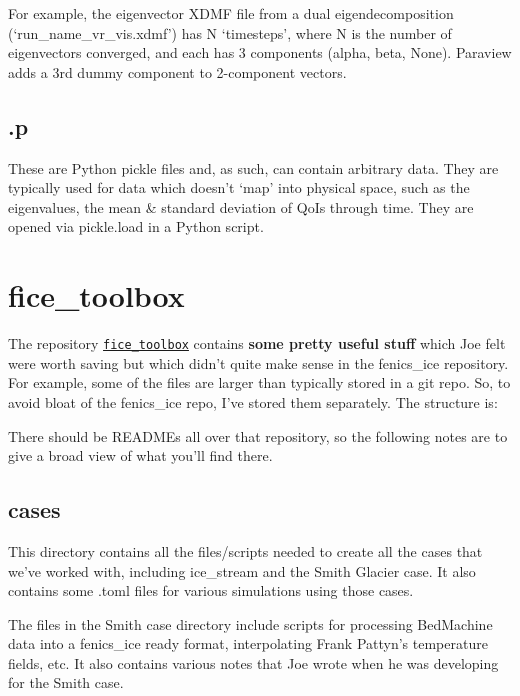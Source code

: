 \documentclass[11pt, reqno, nocenter]{article}
\begin{document}
For example, the eigenvector XDMF file from a dual eigendecomposition (`run\_name\_vr\_vis.xdmf') has N `timesteps', where N is the number of eigenvectors converged, and each has 3 components (alpha, beta, None). Paraview adds a 3rd dummy component to 2-component vectors.

\subsection{.p}

These are Python pickle files and, as such, can contain arbitrary data. They are typically used for data which doesn't `map' into physical space, such as the eigenvalues, the mean \& standard deviation of QoIs through time. They are opened via pickle.load in a Python script.

\section{fice\_toolbox} \label{sec:toolbox}

The repository \href{https://github.com/EdiGlacUQ/fice_toolbox}{{\tt fice\_toolbox}} contains \textbf{some pretty useful stuff} which Joe felt were worth saving but which didn't quite make sense in the fenics\_ice repository. For example, some of the files are larger than typically stored in a git repo.
So, to avoid bloat of the fenics\_ice repo, I've stored them separately. The structure is: \\


There should be READMEs all over that repository, so the following notes are to give a broad view of what you'll find there.

\subsection{cases}

This directory contains all the files/scripts needed to create all the cases that we've worked with, including ice\_stream and the Smith Glacier case. It also contains some .toml files for various simulations using those cases.

The files in the Smith case directory include scripts for processing BedMachine data into a fenics\_ice ready format, interpolating Frank Pattyn's temperature fields, etc. It also contains various notes that Joe wrote when he was developing for the Smith case.
\end{document}
